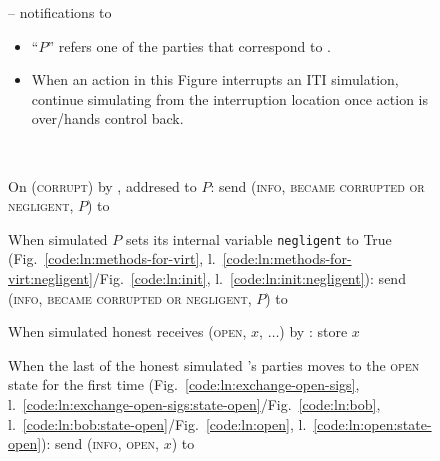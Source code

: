 \begin{figure}[H]
  \begin{simulatorbox}{\simulator{} -- notifications to \fchan}
    \begin{itemize}
      \item ``$P$'' refers one of the parties that correspond to \fchan.
      \item When an action in this Figure interrupts an ITI simulation, continue
      simulating from the interruption location once action is over/\fchan hands
      control back.
    \end{itemize} \ \\
    \begin{algorithmic}[1]
      \State On (\textsc{corrupt}) by \adversary, addresed to $P$:
      \Indent
        \State {}
        \State send (\textsc{info}, \textsc{became corrupted or negligent}, $P$)
        to \fchan
        \label{code:simulator:corrupted}
      \EndIndent
      \Statex

      \State When simulated $P$ sets its internal variable \texttt{negligent} to
      True (Fig.~\ref{code:ln:methods-for-virt},
      l.~\ref{code:ln:methods-for-virt:negligent}/Fig.~\ref{code:ln:init},
      l.~\ref{code:ln:init:negligent}):
      \Indent
        \State send (\textsc{info}, \textsc{became corrupted or negligent}, $P$)
        to \fchan
        \label{code:simulator:negligent}
      \EndIndent
      \Statex

      \State When simulated honest \alice receives (\textsc{open}, $x$, $\dots$)
      by \environment:
      \Indent
        \State store $x$ 
      \EndIndent
      \Statex

      \State When the last of the honest simulated \fchan's parties moves to the
      \textsc{open} state for the first time
      (Fig.~\ref{code:ln:exchange-open-sigs},
      l.~\ref{code:ln:exchange-open-sigs:state-open}/Fig.~\ref{code:ln:bob},
      l.~\ref{code:ln:bob:state-open}/Fig.~\ref{code:ln:open},
      l.~\ref{code:ln:open:state-open}):
      \Indent
         
        \State send (\textsc{info}, \textsc{open}, $x$) to \fchan
        \label{code:simulator:open}
      \EndIndent
      \Statex


\end{algorithmic}
\end{simulatorbox}
\end{figure}
